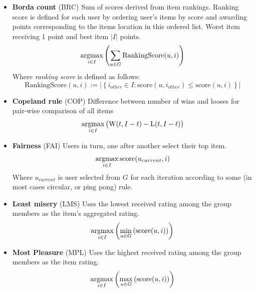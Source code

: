 \begin{itemize}
    \item \textbf{Borda count} (BRC)\newline
        Sum of scores derived from item rankings. Ranking score is defined for each user by ordering user's items by score and awarding points corresponding to the items location in this ordered list. Worst item receiving 1 point and best item $|I|$ points.
        \begin{equation}
                \operatorname*{argmax}_{i \in I}{\left(\sum_{u \in G}{\textrm{RankingScore}(u,i)}\right)}
            \end{equation}
        Where \textit{ranking score} is defined as follows:
        \begin{equation*}
            \textrm{RankingScore}(u,i) := 
            \big\lvert{\left\{
                i_{other} \in I : \textrm{score}(u,i_{other}) \leq \textrm{score}(u,i)
            \right\}}\big\rvert
        \end{equation*}
    
    \item \textbf{Copeland rule} (COP)\newline
        Difference between number of wins and looses for pair-wise comparison of all items
        \begin{equation}
            \operatorname*{argmax}_{i \in I}{
                \big(\textrm{W}(t, I - t) - \textrm{L}(t, I - t)\big)
            }
        \end{equation}
    
    \item \textbf{Fairness} (FAI)\newline
        Users in turn, one after another select their top item.
        \begin{equation}
            \operatorname*{argmax}_{i \in I}{{\textrm{score}(u_{current},i)}}
        \end{equation}
        Where $u_{current}$ is user selected from $G$ for each iteration according to some (in most cases circular, or ping pong) rule.
    
    \item \textbf{Least misery} (LMS)\newline
        Uses the lowest received rating among the group members as the item's aggregated rating.
        \begin{equation}
            \operatorname*{argmax}_{i \in I}{\left(\min_{u \in G}{\left(\textrm{score}(u,i)\right)}\right)}
        \end{equation}
    
    \item \textbf{Most Pleasure} (MPL)\newline
        Uses the highest received rating among the group members as the item rating.
        \begin{equation}
            \operatorname*{argmax}_{i \in I}{\left(\max_{u \in G}{\left(\textrm{score}(u,i)\right)}\right)}
        \end{equation}
        

\end{itemize}
